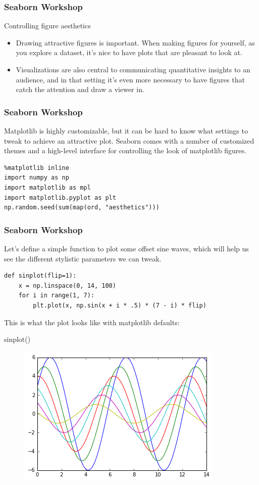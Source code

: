 \documentclass{beamer}
\begin{document}
\begin{frame}[fragile]
\frametitle{Seaborn Workshop}
\large
Controlling figure aesthetics
\begin{itemize}
\item Drawing attractive figures is important. When making figures for yourself, as you explore a dataset, it’s nice to have plots that are pleasant to look at. 
\item Visualizations are also central to communicating quantitative insights to an audience, and in that setting it’s even more necessary to have figures that catch the attention and draw a viewer in.
\end{itemize}

\end{frame}
\begin{frame}[fragile]
\frametitle{Seaborn Workshop}
\large

Matplotlib is highly customizable, but it can be hard to know what settings to tweak to achieve an attractive plot. Seaborn comes with a number of customized themes and a high-level interface for controlling the look of matplotlib figures.
\begin{verbatim}
%matplotlib inline
import numpy as np
import matplotlib as mpl
import matplotlib.pyplot as plt
np.random.seed(sum(map(ord, "aesthetics")))
\end{verbatim}
\end{frame}
\begin{frame}[fragile]
\frametitle{Seaborn Workshop}
\large

Let’s define a simple function to plot some offset sine waves, which will help us see the different stylistic parameters we can tweak.
\begin{verbatim}
def sinplot(flip=1):
    x = np.linspace(0, 14, 100)
    for i in range(1, 7):
        plt.plot(x, np.sin(x + i * .5) * (7 - i) * flip)
 \end{verbatim}
This is what the plot looks like with matplotlib defaults:

sinplot()
\begin{figure}
\centering
\includegraphics[width=0.7\linewidth]{images/aesthetics_8_0}
\caption{}
\label{fig:aesthetics_8_0}
\end{figure}

\end{frame}
\end{document}
